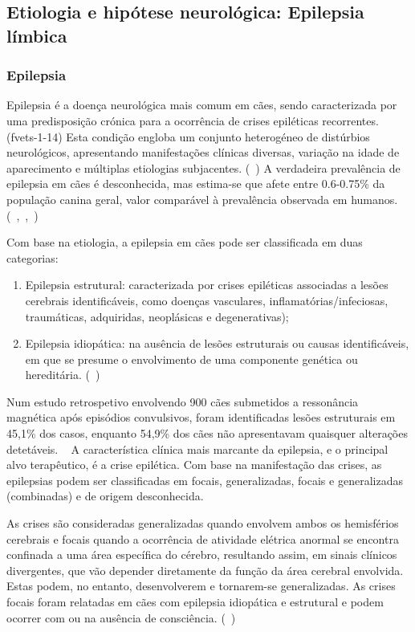 \subsection{Etiologia e hipótese neurológica: Epilepsia límbica}

\subsubsection{Epilepsia}

Epilepsia é a doença neurológica mais comum em cães, sendo caracterizada por uma predisposição crónica para a ocorrência de crises epiléticas recorrentes. (fvets-1-14) Esta condição engloba um conjunto heterogéneo de distúrbios neurológicos, apresentando manifestações clínicas diversas, variação na idade de aparecimento e múltiplas etiologias subjacentes. (~\cite{loscher_dogs_2022}) 
A verdadeira prevalência de epilepsia em cães é desconhecida, mas estima-se que afete entre 0.6-0.75\% da população canina geral, valor comparável à prevalência observada em humanos. (~\cite{von_ruden_role_2023},~\cite{Packer2015},~\cite{loscher_dogs_2022})


Com base na etiologia, a epilepsia em cães pode ser classificada em duas categorias:
 \begin{enumerate}
    \item Epilepsia estrutural: caracterizada por crises epiléticas associadas a lesões cerebrais identificáveis, como doenças vasculares, inflamatórias/infeciosas, traumáticas, adquiridas, neoplásicas e degenerativas);
    \item  Epilepsia idiopática: na ausência de lesões estruturais ou causas identificáveis, em que se presume o envolvimento de uma componente genética ou hereditária. (~\cite{Packer2015})
\end{enumerate}


Num estudo retrospetivo envolvendo 900 cães submetidos a ressonância magnética após episódios convulsivos, foram identificadas lesões estruturais em 45,1\% dos casos, enquanto 54,9\% dos cães não apresentavam quaisquer alterações detetáveis. ~\cite{loscher_dogs_2022}
A característica clínica mais marcante da epilepsia, e o principal alvo terapêutico, é a crise epilética. Com base na manifestação das crises, as epilepsias podem ser classificadas em focais, generalizadas, focais e generalizadas (combinadas) e de origem desconhecida. 


As crises são consideradas generalizadas quando envolvem ambos os hemisférios cerebrais e focais quando a ocorrência de atividade elétrica anormal se encontra confinada a uma área específica do cérebro, resultando assim, em sinais clínicos divergentes, que vão depender diretamente da função da área cerebral envolvida. Estas podem, no entanto, desenvolverem e tornarem-se generalizadas. As crises focais foram relatadas em cães com epilepsia idiopática e estrutural e podem ocorrer com ou na ausência de consciência. (~\cite{Packer2015})


